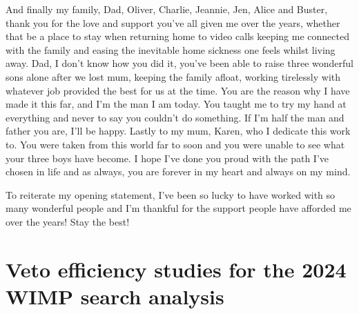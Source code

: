 \documentclass[a4paper,11pt,usegeometry]{scrreprt} %
\begin{document}
And finally my family, Dad, Oliver, Charlie, Jeannie, Jen, Alice and Buster, thank you for the love and support you've all given me over the years, whether that be a place to stay when returning home to video calls keeping me connected with the family and easing the inevitable home sickness one feels whilst living away. Dad, I don't know how you did it, you've been able to raise three wonderful sons alone after we lost mum, keeping the family afloat, working tirelessly with whatever job provided the best for us at the time. You are the reason why I have made it this far, and I'm the man I am today. You taught me to try my hand at everything and never to say you couldn't do something. If I'm half the man and father you are, I'll be happy. Lastly to my mum, Karen, who I dedicate this work to. You were taken from this world far to soon and you were unable to see what your three boys have become. I hope I've done you proud with the path I've chosen in life and as always, you are forever in my heart and always on my mind.

To reiterate my opening statement, I've been so lucky to have worked with so many wonderful people and I'm thankful for the support people have afforded me over the years! Stay the best!

\singlespacing
\tableofcontents
\listoffigures	%
\listoftables  %
\clearpage
{}
\doublespacing %








\printbibliography[heading=bibintoc,title={Bibliography}]
\appendix
\chapter{Veto efficiency studies for the 2024 WIMP search analysis}\label{app:VetoEff}

\end{document}

